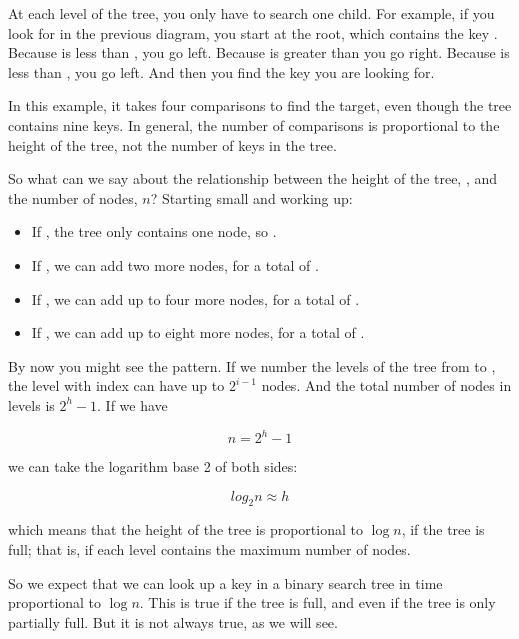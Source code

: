 \documentclass[12pt]{book}
\theoremstyle{exercise}
\begin{document}
At each level of the tree, you only have to search one child. For
example, if you look for  in the previous diagram,
you start at the root, which contains the key . Because
 is less than , you go left. Because
 is greater than  you go right. Because
 is less than , you go left. And then you find
the key you are looking for.

In this example, it takes four comparisons to find the target,
even though the tree contains nine keys. In general, the number of
comparisons is proportional to the height of the tree, not the number of
keys in the tree.


So what can we say about the relationship between the height of the
tree, , and the number of nodes, $n$? Starting small
and working up:

\begin{itemize}

\item
  If , the tree only contains one node, so .

\item
  If , we can add two more nodes, for a total of
  .

\item
  If , we can add up to four more nodes, for a total
  of .

\item
  If , we can add up to eight more nodes, for a total
  of .

\end{itemize}

By now you might see the pattern. If we number the levels of the tree from
 to , the level with index  can have up to
$2^{i-1}$ nodes. And the total number of nodes in  levels is $2^h-1$.
If we have

\[ n = 2^h - 1 \]

we can take the logarithm base 2 of both sides:

\[ log_2 n \approx h \]

which means that the height of the tree is proportional to
$\log n$, if the tree is full; that is, if each level contains the
maximum number of nodes.

So we expect that we can look up a key in a binary search tree in time
proportional to $\log n$. This is true if the tree is full, and
even if the tree is only partially full. But it is not always true, as
we will see.
\end{document}

